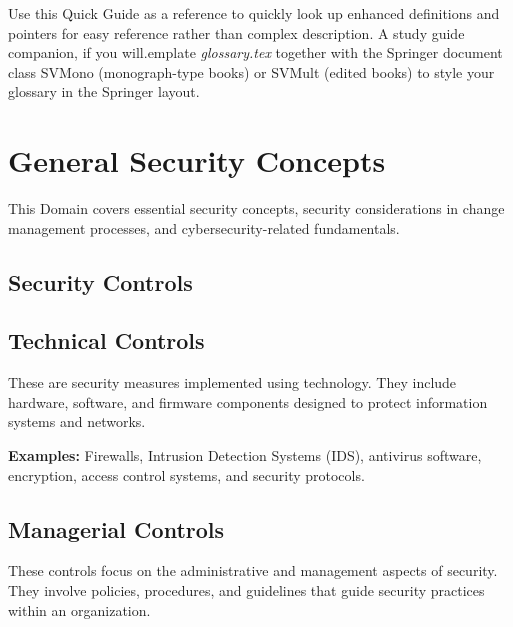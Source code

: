 %
%



Use this Quick Guide as a reference to quickly look up enhanced definitions and pointers for easy reference rather than complex description. A study guide companion, if you will.emplate \emph{glossary.tex} together with the Springer document class SVMono (monograph-type books) or SVMult (edited books) to style your glossary in the Springer layout.

\section{General Security Concepts}
This Domain covers essential security concepts, security considerations in change management processes, and cybersecurity-related fundamentals.

\subsection{Security Controls}
 
\subsection{Technical Controls}
These are security measures implemented using technology. They include hardware, software, and firmware components designed to protect information systems and networks.

\textbf{Examples:} Firewalls, Intrusion Detection Systems (IDS), antivirus software, encryption, access control systems, and security protocols.

\subsection{Managerial Controls}
These controls focus on the administrative and management aspects of security. They involve policies, procedures, and guidelines that guide security practices within an organization.

